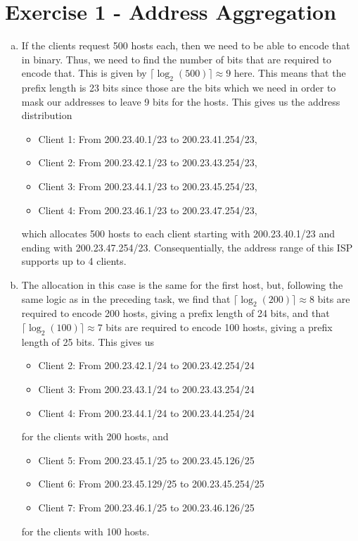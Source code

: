 \documentclass[10pt]{article}
\begin{document}
\section{Exercise 1 - Address Aggregation}
\begin{enumerate}[a)]
    \item If the clients request 500 hosts each, then we need to be able to encode that in binary. Thus, we need to find the number of bits that are required to encode that. This is given by $\lceil\log_2(500)\rceil\approx9$ here. This means that the prefix length is 23 bits since those are the bits which we need in order to mask our addresses to leave 9 bits for the hosts. This gives us the address distribution
        \begin{itemize}
            \item Client 1: From 200.23.40.1/23 to 200.23.41.254/23,
            \item Client 2: From 200.23.42.1/23 to 200.23.43.254/23,
            \item Client 3: From 200.23.44.1/23 to 200.23.45.254/23,
            \item Client 4: From 200.23.46.1/23 to 200.23.47.254/23,
        \end{itemize}
which allocates 500 hosts to each client starting with 200.23.40.1/23 and ending with 200.23.47.254/23. Consequentially, the address range of this ISP supports up to 4 clients.
    \item The allocation in this case is the same for the first host, but, following the same logic as in the preceding task, we find that $\lceil\log_2(200)\rceil\approx8$ bits are required to encode 200 hosts, giving a prefix length of 24 bits, and that $\lceil\log_2(100)\rceil\approx7$ bits are required to encode 100 hosts, giving a prefix length of 25 bits. This gives us
        \begin{itemize}
            \item Client 2: From 200.23.42.1/24 to 200.23.42.254/24
            \item Client 3: From 200.23.43.1/24 to 200.23.43.254/24
            \item Client 4: From 200.23.44.1/24 to 200.23.44.254/24
        \end{itemize}
for the clients with 200 hosts, and
        \begin{itemize}
            \item Client 5: From 200.23.45.1/25 to 200.23.45.126/25
            \item Client 6: From 200.23.45.129/25 to 200.23.45.254/25
            \item Client 7: From 200.23.46.1/25 to 200.23.46.126/25
        \end{itemize}
for the clients with 100 hosts. \\


\end{enumerate}
\end{document}
